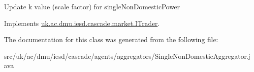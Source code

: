 Update k value (scale factor) for single\-Non\-Domestic\-Power

Implements \hyperlink{interfaceuk_1_1ac_1_1dmu_1_1iesd_1_1cascade_1_1market_1_1_i_trader}{uk.\-ac.\-dmu.\-iesd.\-cascade.\-market.\-I\-Trader}.



The documentation for this class was generated from the following file\-:\begin{DoxyCompactItemize}
\item 
src/uk/ac/dmu/iesd/cascade/agents/aggregators/Single\-Non\-Domestic\-Aggregator.\-java\end{DoxyCompactItemize}
